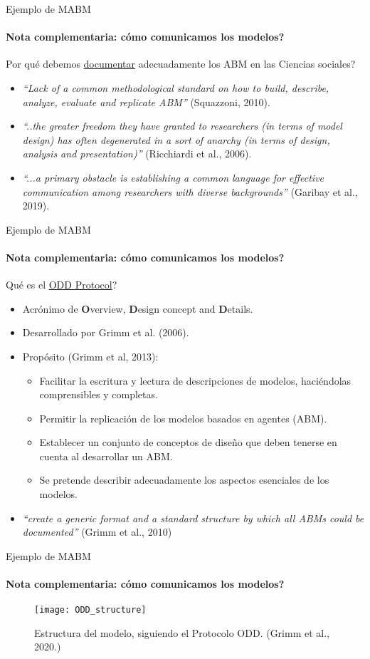 \documentclass[11pt]{beamer}
\begin{document}
\begin{frame}{Ejemplo de MABM}
    \framesubtitle{Nota complementaria: cómo comunicamos los modelos?}
	Por qué debemos \underline{documentar} adecuadamente los ABM en las Ciencias sociales?
	\begin{itemize}
		\small		\item \textit{``Lack of a common methodological standard on how to build, describe, analyze, evaluate and replicate ABM''} (Squazzoni, 2010).
		\item \textit{``..the greater freedom they have granted to researchers (in terms of model design) has often degenerated in a sort of anarchy (in terms of design, analysis and presentation)''} (Ricchiardi et al., 2006).
		\item \textit{``...a primary obstacle is establishing a common language for effective communication among researchers with diverse backgrounds''} (Garibay et al., 2019).
	\end{itemize}
\end{frame}

\begin{frame}{Ejemplo de MABM}
    \framesubtitle{Nota complementaria: cómo comunicamos los modelos?}
	Qué es el \underline{ODD Protocol}?
	\begin{itemize}
		\item Acrónimo de \textbf{O}verview, \textbf{D}esign concept and \textbf{D}etails.
		\item Desarrollado por Grimm et al. (2006).
		\item Propósito (Grimm et al, 2013): 
		\begin{itemize}
			\item Facilitar la escritura y lectura de descripciones de modelos, haciéndolas comprensibles y completas.
\item Permitir la replicación de los modelos basados en agentes (ABM).
\item Establecer un conjunto de conceptos de diseño que deben tenerse en cuenta al desarrollar un ABM.
\item Se pretende describir adecuadamente los aspectos esenciales de los modelos.
\end{itemize} 
		\item \textit{``create a generic format and a standard structure by which all ABMs could be documented''} (Grimm et al., 2010)
	\end{itemize}
\end{frame}

\begin{frame}{Ejemplo de MABM}
    \framesubtitle{Nota complementaria: cómo comunicamos los modelos?}
	\begin{figure}
		\centering
		\texttt{[image: ODD\_structure]}
		\caption{Estructura del modelo, siguiendo el Protocolo ODD. (Grimm et al., 2020.)}
		\label{fig:oddstructure}
	\end{figure}
\end{frame}
\end{document}
